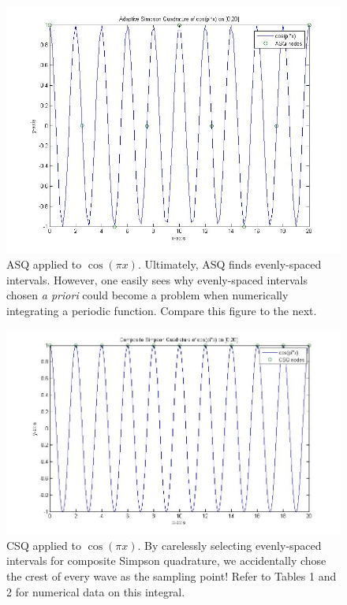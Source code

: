 \begin{center}
\begin{figure}[H]
  \centering
  \includegraphics[width=500px]{graphics/cospix_adaptive_simps.jpg}
  \caption[ASQ applied to $\cos(\pi x)$]{ASQ applied to $\cos(\pi x)$. Ultimately, ASQ finds evenly-spaced intervals. However, one easily sees why evenly-spaced intervals chosen \textit{a priori} could become a problem when numerically integrating a periodic function. Compare this figure to the next.}
\end{figure}

\begin{figure}[H]
  \centering
  \includegraphics[width=500px]{graphics/cospix_composite_simps.jpg}
  \caption[CSQ applied to $\cos(\pi x)$]{CSQ applied to $\cos(\pi x)$. By carelessly selecting evenly-spaced intervals for composite Simpson quadrature, we accidentally chose the crest of every wave as the sampling point! Refer to Tables 1 and 2 for numerical data on this integral.}
\end{figure}
\end{center}